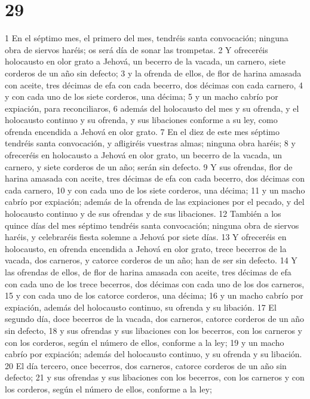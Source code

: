\chapter{29}

1 En el séptimo mes, el primero del mes, tendréis santa convocación; ninguna obra de siervos haréis; os será día de sonar las trompetas.
2 Y ofreceréis holocausto en olor grato a Jehová, un becerro de la vacada, un carnero, siete corderos de un año sin defecto;
3 y la ofrenda de ellos, de flor de harina amasada con aceite, tres décimas de efa   con cada becerro, dos décimas con cada carnero,
4 y con cada uno de los siete corderos, una décima;
5 y un macho cabrío por expiación, para reconciliaros,
6 además del holocausto del mes y su ofrenda, y el holocausto continuo y su ofrenda, y sus libaciones conforme a su ley, como ofrenda encendida a Jehová en olor grato.
7 En el diez de este mes séptimo tendréis santa convocación, y afligiréis vuestras almas; ninguna obra haréis;
8 y ofreceréis en holocausto a Jehová en olor grato, un becerro de la vacada, un carnero, y siete corderos de un año; serán sin defecto.
9 Y sus ofrendas, flor de harina amasada con aceite, tres décimas de efa   con cada becerro, dos décimas con cada carnero,
10 y con cada uno de los siete corderos, una décima;
11 y un macho cabrío por expiación; además de la ofrenda de las expiaciones por el pecado, y del holocausto continuo y de sus ofrendas y de sus libaciones.
12 También a los quince días del mes séptimo tendréis santa convocación; ninguna obra de siervos haréis, y celebraréis fiesta solemne a Jehová por siete días. 
13 Y ofreceréis en holocausto, en ofrenda encendida a Jehová en olor grato, trece becerros de la vacada, dos carneros, y catorce corderos de un año; han de ser sin defecto.
14 Y las ofrendas de ellos, de flor de harina amasada con aceite, tres décimas de efa   con cada uno de los trece becerros, dos décimas con cada uno de los dos carneros,
15 y con cada uno de los catorce corderos, una décima;
16 y un macho cabrío por expiación, además del holocausto continuo, su ofrenda y su libación.
17 El segundo día, doce becerros de la vacada, dos carneros, catorce corderos de un año sin defecto,
18 y sus ofrendas y sus libaciones con los becerros, con los carneros y con los corderos, según el número de ellos, conforme a la ley;
19 y un macho cabrío por expiación; además del holocausto continuo, y su ofrenda y su libación.
20 El día tercero, once becerros, dos carneros, catorce corderos de un año sin defecto;
21 y sus ofrendas y sus libaciones con los becerros, con los carneros y con los corderos, según el número de ellos, conforme a la ley;

